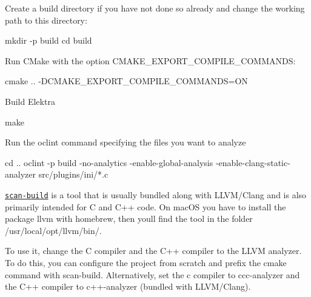 \begin{DoxyEnumerate}
\item Create a build directory if you have not done so already and change the working path to this directory\+:
\end{DoxyEnumerate}


\begin{DoxyCode}
mkdir -p build
cd build
\end{DoxyCode}



\begin{DoxyEnumerate}
\item Run C\+Make with the option {\ttfamily C\+M\+A\+K\+E\+\_\+\+E\+X\+P\+O\+R\+T\+\_\+\+C\+O\+M\+P\+I\+L\+E\+\_\+\+C\+O\+M\+M\+A\+N\+DS}\+:
\end{DoxyEnumerate}


\begin{DoxyCode}
cmake .. -DCMAKE\_EXPORT\_COMPILE\_COMMANDS=ON
\end{DoxyCode}



\begin{DoxyEnumerate}
\item Build Elektra
\end{DoxyEnumerate}


\begin{DoxyCode}
make
\end{DoxyCode}



\begin{DoxyEnumerate}
\item Run the {\ttfamily oclint} command specifying the files you want to analyze
\end{DoxyEnumerate}


\begin{DoxyCode}
cd ..
oclint -p build -no-analytics -enable-global-analysis -enable-clang-static-analyzer src/plugins/ini/*.c
\end{DoxyCode}


\href{http://clang-analyzer.llvm.org/scan-build.html}{\tt scan-\/build} is a tool that is usually bundled along with L\+L\+V\+M/\+Clang and is also primarily intended for C and C++ code. On mac\+OS you have to install the package {\ttfamily llvm} with homebrew, then you\textquotesingle{}ll find the tool in the folder {\ttfamily /usr/local/opt/llvm/bin/}.

To use it, change the C compiler and the C++ compiler to the L\+L\+VM analyzer. To do this, you can configure the project from scratch and prefix the cmake command with {\ttfamily scan-\/build}. Alternatively, set the c compiler to {\ttfamily ccc-\/analyzer} and the C++ compiler to {\ttfamily c++-\/analyzer} (bundled with L\+L\+V\+M/\+Clang).

